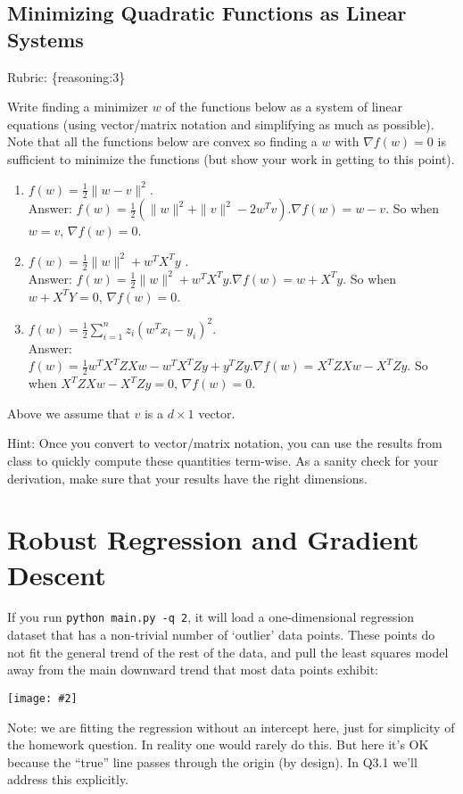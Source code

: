 \documentclass{article}
\def\rubric#1{\gre{Rubric: \{#1\}}}{}
\def\blu#1{{\color{blu}#1}}
\def\gre#1{{\color{gre}#1}}
\def\norm#1{\|#1\|}
\newcommand{\centerfig}[2]{\begin{center}\texttt{[image: \#2]}\end{center}}
\def\enum#1{\begin{enumerate}#1\end{enumerate}}
\begin{document}
\subsection{Minimizing Quadratic Functions as Linear Systems}
\rubric{reasoning:3}

Write finding a minimizer $w$ of the functions below as a system of linear equations (using vector/matrix notation and simplifying as much as possible). Note that all the functions below are convex  so finding a $w$ with $\nabla f(w) = 0$ is sufficient to minimize the functions (but show your work in getting to this point).
\blu{\enum{
\item $f(w) = \frac{1}{2}\norm{w-v}^2$.
\textcolor{gre}{\\Answer: $f(w) = \frac{1}{2}(\norm{w}^2+\norm{v}^2-2w^Tv).\nabla f(w)=w-v.$ So when $w=v$, $\nabla f(w)=0.$}
\item $f(w) = \frac{1}{2}\norm{w}^2 + w^TX^Ty$ .
\textcolor{gre}{\\Answer: $f(w) = \frac{1}{2} \norm{w}^2+w^TX^Ty. \nabla f(w)=w+X^Ty.$ So when $w+X^TY=0$, $\nabla f(w)=0.$}
\item $f(w) = \frac{1}{2}\sum_{i=1}^n z_i (w^Tx_i - y_i)^2$.
\textcolor{gre}{\\Answer: $f(w)=\frac{1}{2}w^TX^TZXw-w^TX^TZy+y^TZy. \nabla f(w)=X^TZXw-X^TZy.$ So when $X^TZXw-X^TZy=0$, $\nabla f(w)=0.$}
}}
Above we assume that $v$ is a $d \times 1$ vector.

Hint: Once you convert to vector/matrix notation, you can use the results from class to quickly compute these quantities term-wise.
As a sanity check for your derivation, make sure that your results have the right dimensions.

\newpage
\section{Robust Regression and Gradient Descent}

If you run \verb|python main.py -q 2|, it will load a one-dimensional regression
dataset that has a non-trivial number of `outlier' data points.
These points do not fit the general trend of the rest of the data,
and pull the least squares model away from the main downward trend that most data points exhibit:

\centerfig{.7}{/Users/rachelsunderland/Desktop/a3_figs/figs/least_squares_outliers.pdf}


Note: we are fitting the regression without an intercept here, just for simplicity of the homework question.
In reality one would rarely do this. But here it's OK because the ``true'' line
passes through the origin (by design). In Q3.1 we'll address this explicitly.
\end{document}
